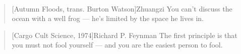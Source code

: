 \clearpage
\thispagestyle{empty}
~\\
\vfill
\begin{quotation}[Autumn Floods, trans. Burton Watson]{Zhuangzi}
You can't discuss the ocean with a well frog --- he's limited by the
space he lives in.
\end{quotation}
\begin{quotation}[Cargo Cult Science, 1974]{Richard P. Feynman}
The first principle is that you must not fool yourself --- and you
are the easiest person to fool.
\end{quotation}
